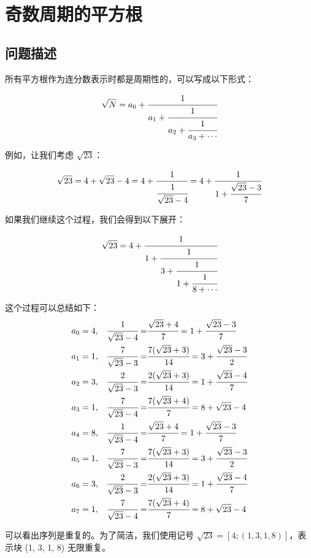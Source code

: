 \section{奇数周期的平方根}\label{sec:problem64}
\subsection{问题描述}
\begin{tcolorbox}[breakable]
	所有平方根作为连分数表示时都是周期性的，可以写成以下形式：

	\[ \sqrt{N} = a_0 + \cfrac{1}{a_1 + \cfrac{1}{a_2 + \cfrac{1}{a_3 + \cdots}}} \]

	例如，让我们考虑 $\sqrt{23}$：

	\[ \sqrt{23} = 4 + \sqrt{23} - 4 = 4 + \cfrac{1}{\cfrac{1}{\sqrt{23} - 4}} = 4 + \cfrac{1}{1 + \cfrac{\sqrt{23} - 3}{7}} \]

	如果我们继续这个过程，我们会得到以下展开：

	\[ \sqrt{23} = 4 + \cfrac{1}{1 + \cfrac{1}{3 + \cfrac{1}{1 + \cfrac{1}{8 + \cdots}}}} \]

	这个过程可以总结如下：
	\begin{align*}
		a_0 & = 4, & \cfrac{1}{\sqrt{23} - 4}  = & \cfrac{\sqrt{23} + 4}{7}      = 1 + \cfrac{\sqrt{23} - 3}{7} \\
		a_1 & = 1, & \cfrac{7}{\sqrt{23} - 3}  = & \cfrac{7(\sqrt{23} + 3)}{14}  = 3 + \cfrac{\sqrt{23} - 3}{2} \\
		a_2 & = 3, & \cfrac{2}{\sqrt{23} - 3}  = & \cfrac{2(\sqrt{23} + 3)}{14}  = 1 + \cfrac{\sqrt{23} - 4}{7} \\
		a_3 & = 1, & \cfrac{7}{\sqrt{23} - 4}  = & \cfrac{7(\sqrt{23} + 4)}{7}   = 8 + \sqrt{23} - 4            \\
		a_4 & = 8, & \cfrac{1}{\sqrt{23} - 4}  = & \cfrac{\sqrt{23} + 4}{7} = 1 + \cfrac{\sqrt{23} - 3}{7}      \\
		a_5 & = 1, & \cfrac{7}{\sqrt{23} - 3}  = & \cfrac{7(\sqrt{23} + 3)}{14} = 3 + \cfrac{\sqrt{23} - 3}{2}  \\
		a_6 & = 3, & \cfrac{2}{\sqrt{23} - 3}  = & \cfrac{2(\sqrt{23} + 3)}{14} = 1 + \cfrac{\sqrt{23} - 4}{7}  \\
		a_7 & = 1, & \cfrac{7}{\sqrt{23} - 4}  = & \cfrac{7(\sqrt{23} + 4)}{7} = 8 + \sqrt{23} - 4              \\
	\end{align*}

	可以看出序列是重复的。为了简洁，我们使用记号 $\sqrt{23} = [4; (1, 3, 1, 8)]$，表示块 (1, 3, 1, 8) 无限重复。


\end{tcolorbox}

